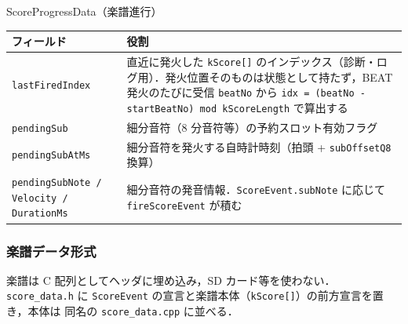 \documentclass[lualatex,book,paper=a4paper,jafontsize=11.5pt,jafontscale=1.05]{jlreq}
\begin{document}
\begin{apibox}{ScoreProgressData（楽譜進行）}
\begin{tabular}{l p{}}
\toprule
\textbf{フィールド} & \textbf{役割} \\
\midrule
\texttt{lastFiredIndex}    & 直近に発火した \texttt{kScore[]} のインデックス（診断・ログ用）．発火位置そのものは状態として持たず，BEAT 発火のたびに受信 \texttt{beatNo} から \texttt{idx = (beatNo - startBeatNo) mod kScoreLength} で算出する \\
\texttt{pendingSub}        & 細分音符（8 分音符等）の予約スロット有効フラグ \\
\texttt{pendingSubAtMs}    & 細分音符を発火する自時計時刻（拍頭 + \texttt{subOffsetQ8} 換算） \\
\texttt{pendingSubNote / Velocity / DurationMs} & 細分音符の発音情報．\texttt{ScoreEvent.subNote} に応じて \texttt{fireScoreEvent} が積む \\
\bottomrule
\end{tabular}
\end{apibox}

\subsubsection{楽譜データ形式}

楽譜は C 配列としてヘッダに埋め込み，SD カード等を使わない．\texttt{score\_data.h} に
\texttt{ScoreEvent} の宣言と楽譜本体（\texttt{kScore[]}）の前方宣言を置き，本体は
同名の \texttt{score\_data.cpp} に並べる．
\end{document}
